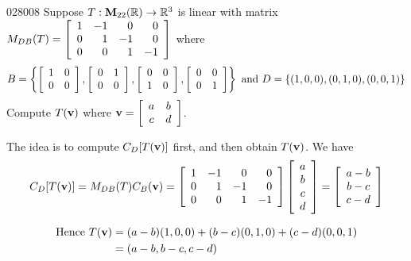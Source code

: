 \begin{example}{}{028008}
Suppose $T : \textbf{M}_{22}(\mathbb{R}) \to \mathbb{R}^3$ is linear with matrix $M_{DB}(T) = \left[ \begin{array}{rrrr} 1 & -1 & 0 & 0 \\ 0 & 1 & -1 & 0 \\ 0 & 0 & 1 & -1 \end{array} \right]$ where
\begin{equation*}
B = \left\{ \left[ \begin{array}{cc} 1 & 0 \\ 0 & 0 \end{array} \right], \left[ \begin{array}{cc} 0 & 1 \\ 0 & 0 \end{array} \right], \left[ \begin{array}{cc} 0 & 0 \\ 1 & 0 \end{array} \right], \left[ \begin{array}{cc} 0 & 0 \\ 0 & 1 \end{array} \right] \right\} \mbox{ and } D = \{(1, 0, 0), (0, 1, 0), (0, 0, 1)\}
\end{equation*}
Compute $T(\textbf{v})$ where $\textbf{v} = \left[ \begin{array}{cc} a & b \\ c & d \end{array} \right]$.


\begin{solution}
  The idea is to compute $C_{D}[T(\textbf{v})]$ first, and then obtain $T(\textbf{v})$. We have
\begin{equation*}
C_D[T(\textbf{v})] = M_{DB}(T)C_B(\textbf{v}) = \left[ \begin{array}{rrrr} 1 & -1 & 0 & 0 \\ 0 & 1 & -1 & 0 \\ 0 & 0 & 1 & -1 \end{array} \right] \left[ \begin{array}{c} a \\ b \\ c \\ d \end{array} \right] = \left[ \begin{array}{c} a - b \\ b - c \\ c - d \end{array} \right]
\end{equation*}

\begin{align*}
\mbox{Hence } T(\textbf{v}) & = (a - b)(1, 0, 0) + (b - c)(0, 1, 0) + (c - d)(0, 0, 1) \\
 & = (a - b, b - c, c - d)
\end{align*}
\end{solution}
\end{example}

